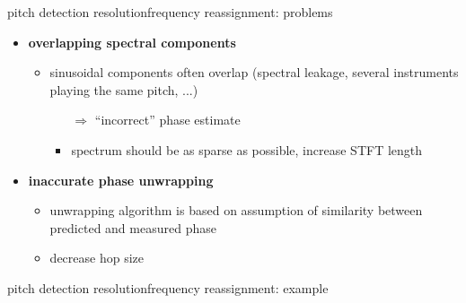         \begin{frame}{pitch detection resolution}{frequency reassignment: problems}
                \begin{itemize}
                    \item   \textbf{overlapping spectral components}
                        \begin{itemize}
                            \item   sinusoidal components often overlap (spectral leakage, several instruments playing the same pitch, ...)
                                \begin{itemize}
                                    \item[$\Rightarrow$] ``incorrect'' phase estimate
                                    \item<1-> spectrum should be as sparse as possible, increase STFT length
                                \end{itemize}
                        \end{itemize}
                    \bigskip
                    \item<2->   \textbf{inaccurate phase unwrapping} 
                        \begin{itemize}
                            \item   unwrapping algorithm is based on assumption of similarity between predicted and measured phase
                            \item<2-> decrease hop size
                        \end{itemize}
                \end{itemize}
        \end{frame}
        \begin{frame}{pitch detection resolution}{frequency reassignment: example}
        \end{frame}

